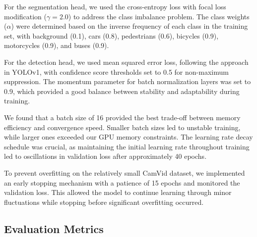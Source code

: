 \documentclass[conference]{IEEEtran}
\begin{document}




For the segmentation head, we used the cross-entropy loss with focal loss modification ($\gamma=2.0$) to address the class imbalance problem. The class weights ($\alpha$) were determined based on the inverse frequency of each class in the training set, with background (0.1), cars (0.8), pedestrians (0.6), bicycles (0.9), motorcycles (0.9), and buses (0.9).

For the detection head, we used mean squared error loss, following the approach in YOLOv1, with confidence score thresholds set to 0.5 for non-maximum suppression. The momentum parameter for batch normalization layers was set to 0.9, which provided a good balance between stability and adaptability during training.

We found that a batch size of 16 provided the best trade-off between memory efficiency and convergence speed. Smaller batch sizes led to unstable training, while larger ones exceeded our GPU memory constraints. The learning rate decay schedule was crucial, as maintaining the initial learning rate throughout training led to oscillations in validation loss after approximately 40 epochs.

To prevent overfitting on the relatively small CamVid dataset, we implemented an early stopping mechanism with a patience of 15 epochs and monitored the validation loss. This allowed the model to continue learning through minor fluctuations while stopping before significant overfitting occurred.



\subsection{Evaluation Metrics}
\end{document}
